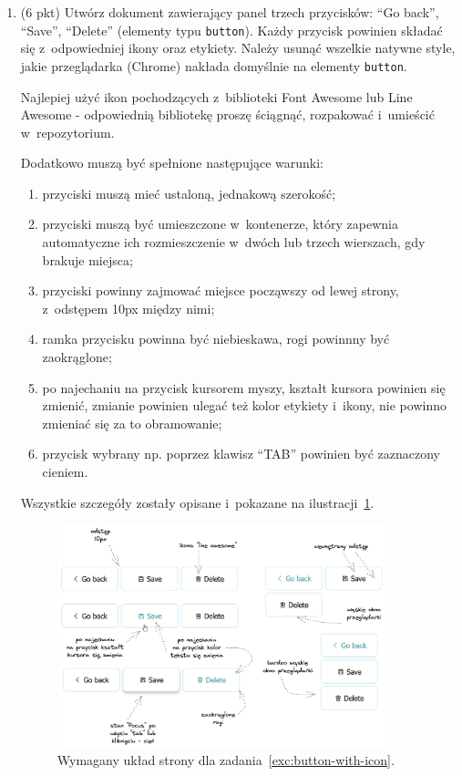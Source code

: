 \documentclass[12pt]{article}
\begin{document}
\begin{enumerate}
        \item\label{exc:button-with-icon}
            (6 pkt) Utwórz dokument zawierający panel trzech przycisków: ``Go back'', ``Save'', ``Delete'' (elementy typu \texttt{button}). Każdy przycisk powinien składać się z~odpowiedniej ikony oraz etykiety. Należy usunąć wszelkie natywne style, jakie przeglądarka (Chrome) nakłada domyślnie na elementy \texttt{button}.

            Najlepiej użyć ikon pochodzących z~biblioteki Font Awesome lub Line Awesome - odpowiednią bibliotekę proszę ściągnąć, rozpakować i~umieścić w~repozytorium.

            Dodatkowo muszą być spełnione następujące warunki:
            \begin{enumerate}
                \item przyciski muszą mieć ustaloną, jednakową szerokość;
                \item przyciski muszą być umieszczone w~kontenerze, który zapewnia automatyczne ich rozmieszczenie w~dwóch lub trzech wierszach, gdy brakuje miejsca;
                \item przyciski powinny zajmować miejsce począwszy od lewej strony, z~odstępem 10px między nimi;
                \item ramka przycisku powinna być niebieskawa, rogi powinnny być zaokrąglone;
                \item po najechaniu na przycisk kursorem myszy, kształt kursora powinien się zmienić, zmianie powinien ulegać też kolor etykiety i~ikony, nie powinno zmieniać się za to obramowanie;
                \item przycisk wybrany np. poprzez klawisz ``TAB'' powinien być zaznaczony cieniem.
            \end{enumerate}

            Wszystkie szczegóły zostały opisane i~pokazane na ilustracji~\ref{fig:button-with-icon}.

            \begin{figure}[p]
                \centering
                \includegraphics[width=0.9\textwidth]{lista-1-3}
                \caption{Wymagany układ strony dla zadania~\ref{exc:button-with-icon}.}
                \label{fig:button-with-icon}
            \end{figure}
    \end{enumerate}
\end{document}
